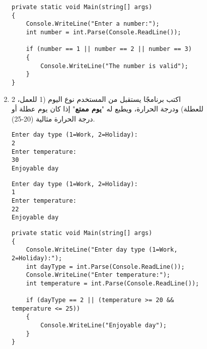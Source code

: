 \documentclass[12pt]{article}
\begin{document}
\begin{enumerate}[itemsep=3em]
\begin{enumerate}[itemsep=3em]
\begin{enumerate}[itemsep=3em]
\begin{enumerate}[itemsep=3em]
\begin{enumerate}
\ifwithsols
\begin{solution}
\begin{english}
\begin{lstlisting}
private static void Main(string[] args)
{
    Console.WriteLine("Enter a number:");
    int number = int.Parse(Console.ReadLine());

    if (number == 1 || number == 2 || number == 3)
    {
        Console.WriteLine("The number is valid");
    }
}
\end{lstlisting}
\end{english}
\end{solution}
\clearpage
\fi
\fi

\item
اكتب برنامجًا يستقبل من المستخدم نوع اليوم (1 للعمل، 2 للعطلة) ودرجة الحرارة، ويطبع له "\textbf{يوم ممتع}" إذا كان يوم عطلة أو درجة الحرارة مثالية (20-25).
\ifdetailed
\begin{example}[1]
\begin{english}
\begin{lstlisting}
Enter day type (1=Work, 2=Holiday):
2
Enter temperature:
30
Enjoyable day
\end{lstlisting}
\end{english}
\end{example}
\begin{example}[2]
\begin{english}
\begin{lstlisting}
Enter day type (1=Work, 2=Holiday):
1
Enter temperature:
22
Enjoyable day
\end{lstlisting}
\end{english}
\end{example}

\ifwithsols
\begin{solution}
\begin{english}
\begin{lstlisting}
private static void Main(string[] args)
{
    Console.WriteLine("Enter day type (1=Work, 2=Holiday):");
    int dayType = int.Parse(Console.ReadLine());
    Console.WriteLine("Enter temperature:");
    int temperature = int.Parse(Console.ReadLine());

    if (dayType == 2 || (temperature >= 20 && temperature <= 25))
    {
        Console.WriteLine("Enjoyable day");
    }
}
\end{lstlisting}
\end{english}
\end{solution}
\clearpage
\fi
\fi


\end{enumerate}
\end{enumerate}
\end{enumerate}
\end{enumerate}
\end{enumerate}
\end{document}
